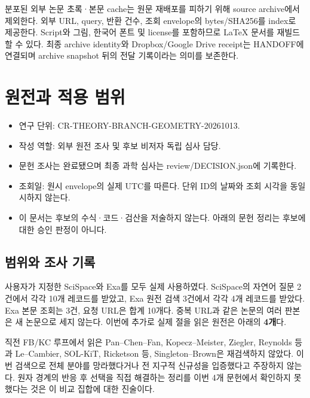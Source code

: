 \documentclass[11pt,a4paper]{article}
\providecommand{\tightlist}{\setlength{\itemsep}{2pt}\setlength{\parskip}{0pt}}
\begin{document}
분포된 외부 논문 초록·본문 cache는 원문 재배포를 피하기 위해 source archive에서 제외한다. 외부 URL, query, 반환 건수, 조회 envelope의 bytes/SHA256를 index로 제공한다. Script와 그림, 한국어 폰트 및 license를 포함하므로 LaTeX 문서를 재빌드할 수 있다. 최종 archive identity와 Dropbox/Google Drive receipt는 HANDOFF에 연결되며 archive snapshot 뒤의 전달 기록이라는 의미를 보존한다.

\clearpage

\hypertarget{uxc6d0uxc804uxacfc-uxc801uxc6a9-uxbc94uxc704}{%
\section{원전과 적용 범위}\label{uxc6d0uxc804uxacfc-uxc801uxc6a9-uxbc94uxc704}}

\begingroup
\small

\begin{itemize}
\tightlist
\item
  연구 단위: CR-THEORY-BRANCH-GEOMETRY-20261013.
\item
  작성 역할: 외부 원전 조사 및 후보 비저자 독립 심사 담당.
\item
  문헌 조사는 완료됐으며 최종 과학 심사는 review/DECISION.json에 기록한다.
\item
  조회일: 원시 envelope의 실제 UTC를 따른다. 단위 ID의 날짜와 조회 시각을 동일시하지 않는다.
\item
  이 문서는 후보의 수식·코드·검산을 저술하지 않는다. 아래의 문헌 정리는 후보에 대한 승인 판정이 아니다.
\end{itemize}

\hypertarget{uxbc94uxc704uxc640-uxc870uxc0ac-uxae30uxb85d}{%
\subsection{범위와 조사 기록}\label{uxbc94uxc704uxc640-uxc870uxc0ac-uxae30uxb85d}}

사용자가 지정한 SciSpace와 Exa를 모두 실제 사용하였다. SciSpace의 자연어 질문 2건에서 각각 10개 레코드를 받았고, Exa 원전 검색 3건에서 각각 4개 레코드를 받았다. Exa 본문 조회는 3건, 요청 URL은 합계 10개다. 중복 URL과 같은 논문의 여러 판본은 새 논문으로 세지 않는다. 이번에 추가로 실제 절을 읽은 원전은 아래의 \textbf{4개}다.

직전 FB/KC 루프에서 읽은 Pan--Chen--Fan, Kopecz--Meister, Ziegler, Reynolds 등과 Le--Cambier, SOL-KiT, Ricketson 등, Singleton--Brown은 재검색하지 않았다. 이번 검색으로 전체 분야를 망라했다거나 전 지구적 신규성을 입증했다고 주장하지 않는다. 원자 경계의 반응 후 선택을 직접 해결하는 정리를 이번 4개 문헌에서 확인하지 못했다는 것은 이 비교 집합에 대한 진술이다.
\end{document}
